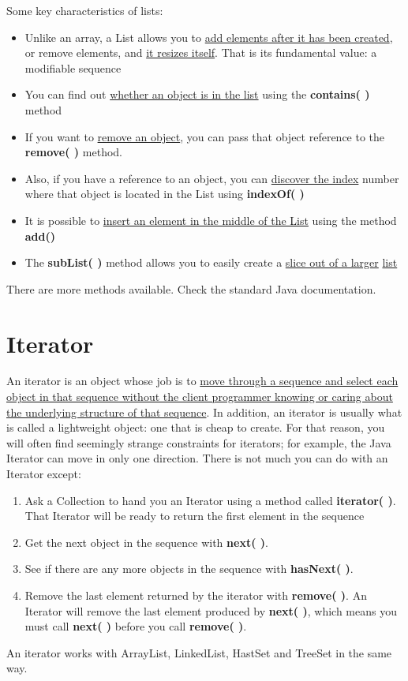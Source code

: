 \documentclass[10pt,letterpaper]{report}
\begin{document}
Some key characteristics of lists:
\begin{itemize}
\item Unlike an array, a List allows you to \underline{add elements after it has been created}, or remove elements, and \underline{it resizes itself}.  That is its fundamental value: a modifiable sequence
\item You can find out \underline{whether an object is in the list} using the \textbf{contains( )} method
\item If you want to \underline{remove an object}, you can pass that object reference to the \textbf{remove( )} method.
\item Also, if you have a reference to an object, you can \underline{discover the index} number where that object is located in the List using \textbf{indexOf( )}
\item It is possible to \underline{insert an element in the middle of the List} using the method \textbf{add()}
\item The \textbf{subList( )} method allows you to easily create a \underline{slice out of a larger} \underline{list}
\end{itemize}
There are more methods available. Check the standard Java documentation.
\section{Iterator}
An iterator is an object whose job is to \underline{move through a sequence and select each} \underline{object in that sequence without the client programmer knowing or caring about} \underline{the underlying structure of that sequence}. In addition, an iterator is usually what is called a lightweight object: one that is cheap to create. For that reason, you will often find seemingly strange constraints for iterators; for example, the Java Iterator can move in only one direction. There is not much you can do with an Iterator except:
\begin{enumerate}
\item Ask a Collection to hand you an Iterator using a method called \textbf{iterator( )}. That Iterator will be ready to return the first element in the sequence
\item Get the next object in the sequence with \textbf{next( )}.
\item See if there are any more objects in the sequence with \textbf{hasNext( )}.
\item Remove the last element returned by the iterator with \textbf{remove( )}. An Iterator will remove the last element produced by \textbf{next( )}, which means you must call \textbf{next( )} before you call \textbf{remove( )}.
\end{enumerate}
An iterator works with ArrayList, LinkedList, HastSet and TreeSet in the same way.
\end{document}
